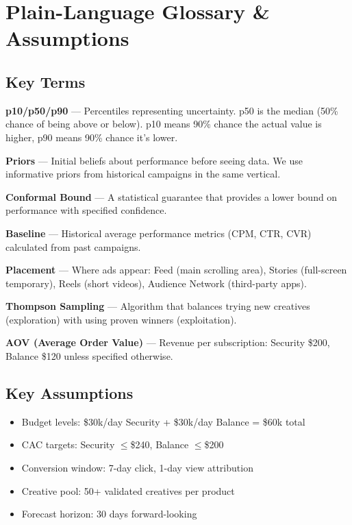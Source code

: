 \documentclass[11pt,a4paper]{report}
\begin{document}
\chapter{Plain-Language Glossary \& Assumptions}

\section{Key Terms}

\begin{glossarybox}
\textbf{p10/p50/p90} --- Percentiles representing uncertainty. p50 is the median (50\% chance of being above or below). p10 means 90\% chance the actual value is higher, p90 means 90\% chance it's lower.

\textbf{Priors} --- Initial beliefs about performance before seeing data. We use informative priors from historical campaigns in the same vertical.

\textbf{Conformal Bound} --- A statistical guarantee that provides a lower bound on performance with specified confidence.

\textbf{Baseline} --- Historical average performance metrics (CPM, CTR, CVR) calculated from past campaigns.

\textbf{Placement} --- Where ads appear: Feed (main scrolling area), Stories (full-screen temporary), Reels (short videos), Audience Network (third-party apps).

\textbf{Thompson Sampling} --- Algorithm that balances trying new creatives (exploration) with using proven winners (exploitation).

\textbf{AOV (Average Order Value)} --- Revenue per subscription: Security \$200, Balance \$120 unless specified otherwise.
\end{glossarybox}

\section{Key Assumptions}

\begin{metricbox}
\begin{itemize}
    \item Budget levels: \$30k/day Security + \$30k/day Balance = \$60k total
    \item CAC targets: Security $\leq$\$240, Balance $\leq$\$200
    \item Conversion window: 7-day click, 1-day view attribution
    \item Creative pool: 50+ validated creatives per product
    \item Forecast horizon: 30 days forward-looking
\end{itemize}
\end{metricbox}
\end{document}
